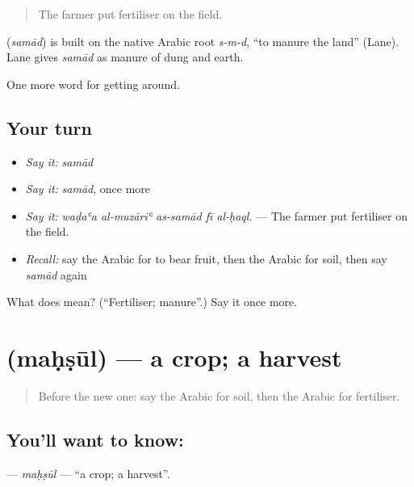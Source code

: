 \begin{quote}
The farmer put fertiliser on the field.
\end{quote}

\begin{cousinweb}
\textbf{} (\emph{samād}) is built on the native Arabic root \emph{s-m-d}, \textquotedblleft{}to manure the land\textquotedblright{} (Lane). Lane gives \emph{samād} as manure of dung and earth.
\end{cousinweb}

\begin{grammarlens}[title={What you've built}]
One more word for getting around.
\end{grammarlens}

\subsection*{Your turn}
\begin{itemize}
\raggedright
  \item \emph{Say it:} \emph{samād}
  \item \emph{Say it:} \emph{samād}, once more
  \item \emph{Say it:} \emph{waḍaʿa al-muzāriʿ as-samād fī al-ḥaql.} — The farmer put fertiliser on the field.
  \item \emph{Recall:} say the Arabic for to bear fruit, then the Arabic for soil, then say \emph{samād} again
\end{itemize}

\begin{tcolorbox}[breakable,colback=teal!4,colframe=teal!35!black,title={Before you move on}]
What does  mean? (\textquotedblleft{}Fertiliser; manure\textquotedblright{}.) Say it once more.
\end{tcolorbox}
\section[\texorpdfstring{\ar{محصول} (maḥṣūl)}{محصول (maḥṣūl)}]{ (maḥṣūl) — a crop; a harvest}

\label{lesson:AR-C469-mahsul}



\begin{quote}
Before the new one: say the Arabic for soil, then the Arabic for fertiliser.
\end{quote}

\subsection*{You'll want to know: }
\textbf{} — \emph{maḥṣūl} — \textquotedblleft{}a crop; a harvest\textquotedblright{}.


